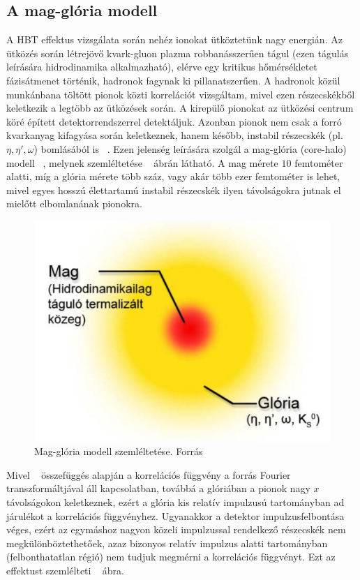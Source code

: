 \documentclass[10pt,a4paper]{article}
\numberwithin{equation}{subsection}
\numberwithin{figure}{section}
\begin{document}
\subsection{A mag-glória modell}
A HBT effektus vizsgálata során nehéz ionokat ütköztetünk nagy energián. Az ütközés során létrejövő kvark-gluon plazma robbanásszerűen tágul (ezen tágulás leírására hidrodinamika alkalmazható), elérve egy kritikus hőmérsékletet fázisátmenet történik, hadronok fagynak ki pillanatszerűen. A hadronok közül munkánbana  töltött pionok közti korrelációt vizsgáltam, mivel ezen részecskékből keletkezik a legtöbb az ütközések során. A kirepülő pionokat az ütközési centrum köré épített detektorrendszerrel detektáljuk. Azonban pionok nem csak a forró kvarkanyag kifagyása során  keletkeznek, hanem később, instabil részecskék (pl. $\eta,\eta',\omega$) bomlásából is ~\cite{Bolz:1992hc}. Ezen jelenség leírására szolgál a mag-glória (core-halo) modell ~\cite{Csorgo:1994in,Csorgo:1999sj}, melynek szemléltetése ~ ábrán látható. A mag mérete $10$ femtométer alatti, míg a glória mérete több száz, vagy akár több ezer femtométer is lehet, mivel egyes hosszú élettartamú instabil részecskék ilyen távolságokra jutnak el mielőtt elbomlanának pionokra.
\begin{figure}[H]
\centering
\includegraphics[scale=0.5]{pic/BEintro/CH1}
\caption{Mag-glória modell szemléltetése. Forrás \cite{Kofarago}}
\label{fig:ch1}
\end{figure}

Mivel ~ összefüggés alapján a korrelációs függvény a forrás Fourier transzformáltjával áll kapcsolatban, továbbá a glóriában a pionok nagy $x$ távolságokon keletkeznek, ezért a glória  kis relatív impulzusú tartományban ad járulékot a korrelációs függvényhez. Ugyanakkor a detektor impulzusfelbontása véges, ezért az egymáshoz nagyon közeli impulzussal rendelkező részecskék nem megkülönböztethetőek, azaz bizonyos relatív impulzus alatti tartományban (felbonthatatlan régió) nem tudjuk megmérni a korrelációs függvényt. Ezt az effektust szemlélteti ~ ábra.
\end{document}
